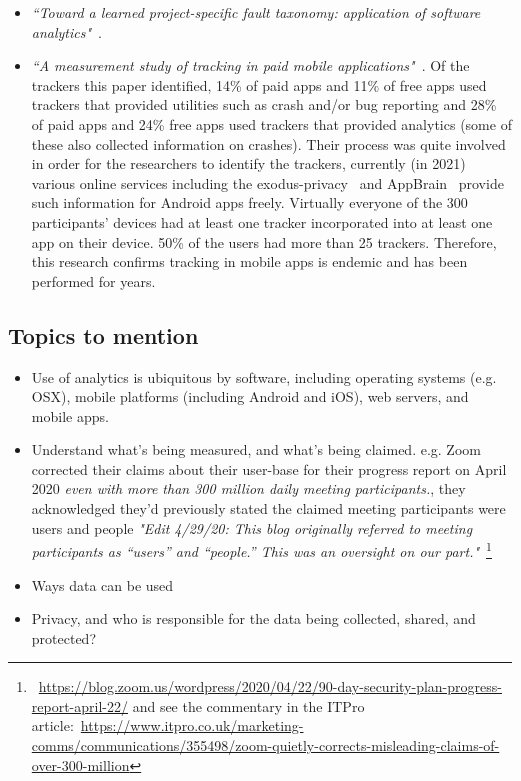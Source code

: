 \begin{itemize}
    \item \emph{``Toward a learned project-specific fault taxonomy: application of software analytics"}~\cite{kidwell2015_toward_fault_taxonomy_application_of_software_analytics}.
    
    \item \emph{``A measurement study of tracking in paid mobile applications"}~\citep{seneviratne2015_a_measurement_study_of_tracking_in_paid_mobile_apps}. Of the trackers this paper identified, 14\% of paid apps and 11\% of free apps used trackers that provided utilities such as crash and/or bug reporting and 28\% of paid apps and 24\% free apps used trackers that provided analytics (some of these also collected information on crashes). Their process was quite involved in order for the researchers to identify the trackers, currently (in 2021) various online services including the exodus-privacy~\citep{exodus_privacy_project} and AppBrain~\citep{appbrain} provide such information for Android apps freely. Virtually everyone of the 300 participants' devices had at least one tracker incorporated into at least one app on their device. 50\% of the users had more than 25 trackers. Therefore, this research confirms tracking in mobile apps is endemic and has been performed for years. 
    
\end{itemize}

\subsection{Topics to mention}
\begin{itemize}
    \item Use of analytics is ubiquitous by software, including operating systems (e.g. OSX), mobile platforms (including Android and iOS), web servers, and mobile apps. 
    \item Understand what's being measured, and what's being claimed. e.g. Zoom corrected their claims about their user-base for their progress report on  April 2020 \emph{even with more than 300 million daily meeting participants.}, they acknowledged they'd previously stated the claimed meeting participants were users and people \emph{"Edit 4/29/20: This blog originally referred to meeting participants as “users” and “people.” This was an oversight on our part."}~\footnote{~\url{https://blog.zoom.us/wordpress/2020/04/22/90-day-security-plan-progress-report-april-22/} and see the commentary in the ITPro article:~\url{https://www.itpro.co.uk/marketing-comms/communications/355498/zoom-quietly-corrects-misleading-claims-of-over-300-million}}
    \item Ways data can be used
    \item Privacy, and who is responsible for the data being collected, shared, and protected?
\end{itemize}

